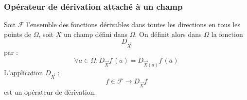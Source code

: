 \subsubsection{Opérateur de dérivation attaché à un champ}
\begin{prop}
 Soit $\mathcal F$ l'ensemble des fonctions dérivables dans toutes les directions en tous les points de $\Omega$, soit $X$ un champ défini dans $\Omega$. On définit alors dans $\Omega$ la fonction
\begin{displaymath}
 D_{\overrightarrow X}
\end{displaymath}
par :
\begin{displaymath}
\forall a\in \Omega : D_{\overrightarrow X}f\,(a) = D_{\overrightarrow X(a)}f\,(a) 
\end{displaymath}
L'application $D_{\overrightarrow X}$ :
\begin{displaymath}
 f\in \mathcal F \rightarrow D_{\overrightarrow X}f
\end{displaymath}
est un opérateur de dérivation.
\end{prop}

